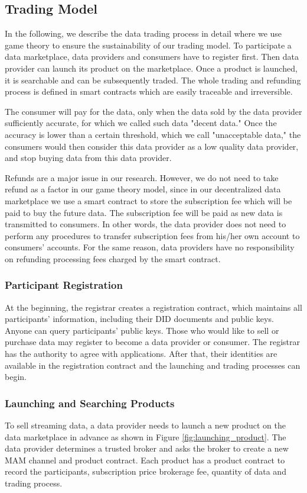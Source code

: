 \documentclass[journal,article,applsci,submit,moreauthors,pdftex]{Definitions/mdpi}
\begin{document}
\subsection{Trading Model}
In the following, we describe the data trading process in detail where we use game theory to ensure the sustainability of our trading model. To participate a data marketplace, data providers and consumers have to register first. Then data provider can launch its product on the marketplace. Once a product is launched, it is searchable and can be subsequently traded. The whole trading and refunding process is defined in smart contracts which are easily traceable and irreversible.

The consumer will pay for the data, only when the data sold by the data provider sufficiently accurate, for which we called such data "decent data."
Once the accuracy is lower than a certain threshold, which we call "unacceptable data," the consumers would then consider this data provider as a low quality data provider, and stop buying data from this data provider.

Refunds are a major issue in our research. However, we do not need to take refund as a factor in our game theory model, since in our decentralized data marketplace we use a smart contract to store the subscription fee which will be paid to buy the future data. The subscription fee will be paid as new data is transmitted to consumers. In other words, the data provider does not need to perform any procedures to transfer subscription fees from his/her own account to consumers' accounts. For the same reason, data providers have no responsibility on refunding processing fees charged by the smart contract.

\subsubsection{Participant Registration}
At the beginning, the registrar creates a registration contract, which maintains all participants' information, including their DID documents and public keys. Anyone can query participants' public keys. Those who would like to sell or purchase data may register to become a data provider or consumer. The registrar has the authority to agree with applications. After that, their identities are available in the registration contract and the launching and trading processes can begin.

\subsubsection{Launching and Searching Products}
To sell streaming data, a data provider needs to launch a new product on the data marketplace in advance as shown in Figure \ref{fig:launching_product}. The data provider determines a trusted broker and asks the broker to create a new MAM channel and product contract. Each product has a product contract to record the participants, subscription price brokerage fee, quantity of data and  trading process.
\end{document}
